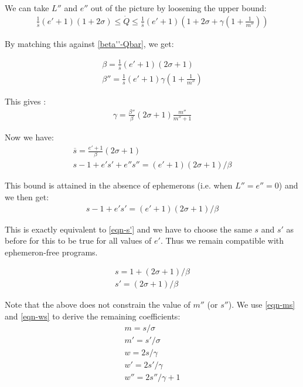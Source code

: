 \documentclass{article}
\begin{document}
We can take $L''$ and $e''$ out of the picture by loosening the upper
bound:
\begin{gather}
\frac{1}{\overline{s}}(e'+1)(1 + 2\sigma) \leq \dot{Q} \leq
\frac{1}{\overline{s}}(e'+1)(1 + 2\sigma + \gamma(1 + \frac{1}{m''}))
\end{gather}


By matching this against \eqref{beta''-Qbar}, we get:

\begin{gather}
\beta = \frac{1}{\overline{s}}(e'+1)(2\sigma+1) \\
\beta'' = \frac{1}{\overline{s}}(e'+1)\gamma(1+\frac{1}{m''})
\end{gather}

This gives :
\begin{gather}
\gamma = \frac{\beta''}{\beta}(2\sigma+1)\frac{m''}{m''+1} \label{eqn-gamma}
\end{gather}

Now we have:
\begin{gather}
\overline{s} = \frac{e'+1}{\beta}(2\sigma+1) \\
s - 1 + e's' + e''s'' = (e'+1)(2\sigma+1)/\beta
\end{gather}

This bound is attained in the absence of ephemerons (i.e. when
$L'' = e'' = 0$) and we then get:
\begin{gather}
s - 1 + e's' = (e'+1)(2\sigma+1)/\beta
\end{gather}

This is exactly equivalent to \eqref{eqn-s'} and we
have to choose the same $s$ and $s'$ as before for this to be true for
all values of $e'$. Thus we remain compatible with
ephemeron-free programs.

\begin{gather}
s = 1 + (2\sigma + 1)/\beta \\
s' = (2\sigma + 1)/\beta
\end{gather}

Note that the above does not constrain the value of $m''$ (or $s''$).
We use \eqref{eqn-ms} and \eqref{eqn-ws} to derive the remaining
coefficients:
\begin{gather}
m = s/\sigma \\
m' = s'/\sigma \\
w = 2s/\gamma \\
w' = 2s'/\gamma \\
w'' = 2s''/\gamma + 1
\end{gather}
\end{document}
